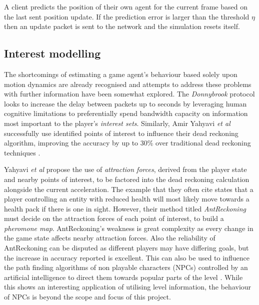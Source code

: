 \documentclass[journal]{IEEEtran}
\begin{document}
\begin{algorithm}
\DontPrintSemicolon %
\caption{A client predicts the position of their own agent for the current frame based on the last sent position update. If the prediction error is larger than the threshold ${\eta}$ then an update packet is sent to the network and the simulation resets itself.}
\label{algo:pseudo}
\end{algorithm}

\subsection{Interest modelling} \label{interestModelling}

The shortcomings of estimating a game agent's behaviour based solely upon motion dynamics are already recognised and attempts to address these problems with further information have been somewhat explored. The \textit{Donnybrook} protocol \cite{bharambe2008donnybrook} looks to increase the delay between packets up to seconds by leveraging human cognitive limitations to preferentially spend bandwidth capacity on information most important to the player's \textit{interest sets}. Similarly, Amir Yahyavi \textit{et al} successfully use identified points of interest to influence their dead reckoning algorithm, improving the accuracy by up to 30\% over traditional dead reckoning techniques \cite{yahyavi2011antreckoning}.

Yahyavi \textit{et al} propose the use of \textit{attraction forces}, derived from the player state and nearby points of interest, to be factored into the dead reckoning calculation alongside the current acceleration. The example that they often cite states that a player controlling an entity with reduced health will most likely move towards a health pack if there is one in sight. However, their method titled \textit{AntReckoning} must decide on the attraction forces of each point of interest, to build a \textit{pheromone map}. AntReckoning's weakness is great complexity as every change in the game state affects nearby attraction forces. Also the reliability of AntReckoning can be disputed as different players may have differing goals, but the increase in accuracy reported is excellent. This can also be used to influence the path finding algorithms of non playable characters (NPCs) controlled by an artificial intelligence to direct them towards popular parts of the level \cite{yahyavi2013interest} \cite{yahyavi2013towards}. While this shows an interesting application of utilising level information, the behaviour of NPCs is beyond the scope and focus of this project.
\end{document}
